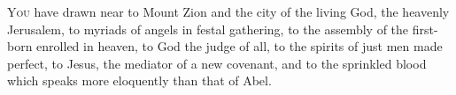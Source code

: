 
\lettrine{Y}{ou} have drawn near to Mount Zion and the city of the living God, the heavenly Jerusalem, to myriads of angels in festal gathering, to the assembly of the first-born enrolled in heaven, to God the judge of all, to the spirits of just men made perfect, to Jesus, the mediator of a new covenant, and to the sprinkled blood which speaks more eloquently than that of Abel.